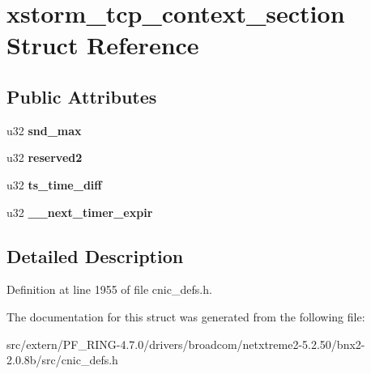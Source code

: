 \hypertarget{structxstorm__tcp__context__section}{
\section{xstorm\_\-tcp\_\-context\_\-section Struct Reference}
\label{structxstorm__tcp__context__section}
}
\subsection*{Public Attributes}
\begin{DoxyCompactItemize}
\item 
\hypertarget{structxstorm__tcp__context__section_a782ad6f67cefaab6a01ecb07d8174b72}{
u32 {\bfseries snd\_\-max}}
\label{structxstorm__tcp__context__section_a782ad6f67cefaab6a01ecb07d8174b72}

\item 
\hypertarget{structxstorm__tcp__context__section_ab2402a07e911239b4c92a8dd7a6a2d36}{
u32 {\bfseries reserved2}}
\label{structxstorm__tcp__context__section_ab2402a07e911239b4c92a8dd7a6a2d36}

\item 
\hypertarget{structxstorm__tcp__context__section_ac7317ebede46f0d93e05958734eb775a}{
u32 {\bfseries ts\_\-time\_\-diff}}
\label{structxstorm__tcp__context__section_ac7317ebede46f0d93e05958734eb775a}

\item 
\hypertarget{structxstorm__tcp__context__section_a00d81f361cc2316daa27df57723ffa55}{
u32 {\bfseries \_\-\_\-next\_\-timer\_\-expir}}
\label{structxstorm__tcp__context__section_a00d81f361cc2316daa27df57723ffa55}

\end{DoxyCompactItemize}


\subsection{Detailed Description}


Definition at line 1955 of file cnic\_\-defs.h.



The documentation for this struct was generated from the following file:\begin{DoxyCompactItemize}
\item 
src/extern/PF\_\-RING-\/4.7.0/drivers/broadcom/netxtreme2-\/5.2.50/bnx2-\/2.0.8b/src/cnic\_\-defs.h\end{DoxyCompactItemize}
